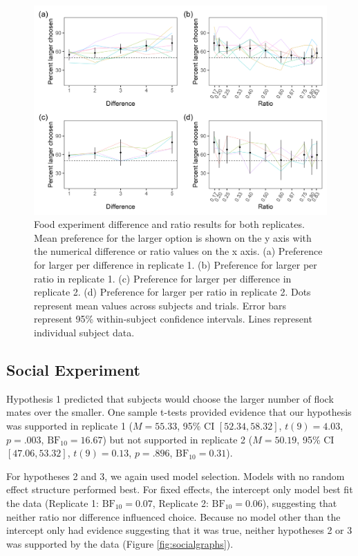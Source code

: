\documentclass[
  ,pub,floatsintext]{apa6}
\begin{document}
\begin{figure}

{\centering \includegraphics[width=0.9\linewidth]{figures/food_figure} 

}

\caption{Food experiment difference and ratio results for both replicates. Mean preference for the larger option is shown on the y axis with the numerical difference or ratio values on the x axis. (a) Preference for larger per difference in replicate 1. (b) Preference for larger per ratio in replicate 1. (c) Preference for larger per difference in replicate 2. (d) Preference for larger per ratio in replicate 2. Dots represent mean values across subjects and trials. Error bars represent 95\% within-subject confidence intervals. Lines represent individual subject data.}\label{fig:foodgraphs}
\end{figure}

\hypertarget{social-experiment-1}{%
\subsection{Social Experiment}\label{social-experiment-1}}

Hypothesis 1 predicted that subjects would choose the larger number of flock mates over the smaller. One sample t-tests provided evidence that our hypothesis was supported in replicate 1 (\(M = 55.33\), 95\% CI \([52.34, 58.32]\), \(t(9) = 4.03\), \(p = .003\), \(\mathrm{BF}_{\textrm{10}} = 16.67\)) but not supported in replicate 2 (\(M = 50.19\), 95\% CI \([47.06, 53.32]\), \(t(9) = 0.13\), \(p = .896\), \(\mathrm{BF}_{\textrm{10}} = 0.31\)).

For hypotheses 2 and 3, we again used model selection. Models with no random effect structure performed best. For fixed effects, the intercept only model best fit the data (Replicate 1: \(\mathrm{BF}_{\textrm{10}} = 0.07\), Replicate 2: \(\mathrm{BF}_{\textrm{10}} = 0.06\)), suggesting that neither ratio nor difference influenced choice. Because no model other than the intercept only had evidence suggesting that it was true, neither hypotheses 2 or 3 was supported by the data (Figure \ref{fig:socialgraphs}).
\end{document}
